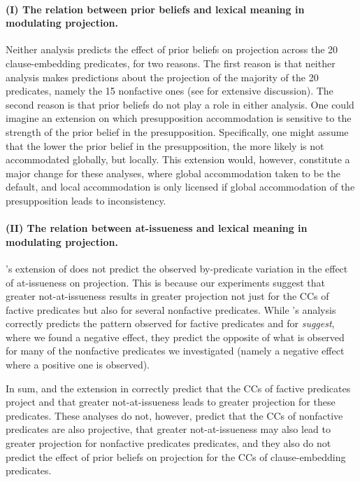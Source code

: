 \documentclass[11pt,fleqn]{article}
\newcommand{\6}{\mbox{$[\hspace*{-.6mm}[$}}
\newcommand{\9}{\mbox{$]\hspace*{-.6mm}]$}}
\newcommand{\citepos}[1]{\citeauthor{#1}'s \citeyear{#1}}
\begin{document}
\paragraph{(I) The relation between prior beliefs and lexical meaning in modulating projection.}
Neither analysis predicts the effect of prior beliefs on projection across the 20 clause-embedding predicates, for two reasons. The first reason is that neither analysis makes predictions about the projection of the majority of the 20 predicates, namely the 15 nonfactive ones (see \citealt{degen-tonhauser-language} for extensive discussion). The second reason is that prior beliefs do not play a role in either analysis. One could imagine an extension on which presupposition accommodation is sensitive to the strength of the prior belief in the presupposition. Specifically, one might assume that the lower the prior belief in the presupposition, the more likely is not accommodated globally, but locally. This extension would, however, constitute a major change for these analyses, where global accommodation taken to be the default, and local accommodation is only licensed if global accommodation of the presupposition leads to inconsistency.

\paragraph{(II) The relation between at-issueness and lexical meaning in modulating projection.} \citepos{djaerv-bacovcin2020} extension of \citealt{heim83} does not predict the observed by-predicate variation in the effect of at-issueness on projection. This is because our experiments suggest that greater not-at-issueness results in greater projection not just for the CCs of factive predicates but also for several nonfactive predicates. While \citepos{djaerv-bacovcin2020} analysis correctly predicts the pattern observed for factive predicates and for {\em suggest}, where we found a negative effect, they predict the opposite of what is observed for many of the nonfactive predicates we investigated (namely a negative effect where a positive one is observed).

\bigskip

In sum, \citealt{heim83} and the extension in \citealt{djaerv-bacovcin2020} correctly predict that the CCs of factive predicates project and that greater not-at-issueness leads to greater projection for these predicates. These analyses do not, however, predict that the CCs of nonfactive predicates are also projective, that greater not-at-issueness may also lead to greater projection for nonfactive predicates predicates, and they also do not predict the effect of prior beliefs on projection for the CCs of clause-embedding predicates.
\end{document}
